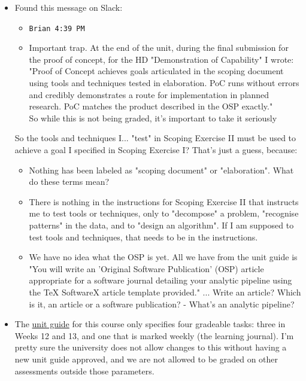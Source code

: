 \documentclass[12pt]{article}
\begin{document}
\begin{itemize}
    \item Found this message on Slack: 
    \begin{itemize}
    \renewcommand{\labelitemii}{$\nobullet$}
        \item \texttt{Brian 4:39 PM}
        \item Important trap. At the end of the unit, during the final submission for the proof of concept, for the HD "Demonstration of Capability" I wrote: "Proof of Concept achieves goals articulated in the scoping document using tools and techniques tested in elaboration. PoC runs without errors and credibly demonstrates a route for implementation in planned research. PoC matches the product described in the OSP exactly."
        \\So while this is not being graded, it's important to take it seriously
    \end{itemize}
    So the tools and techniques I... "test" in Scoping Exercise II must be used to achieve a goal I specified in Scoping Exercise I? That's just a guess, because:
    \begin{itemize}
        \item Nothing has been labeled as "scoping document" or "elaboration". What do these terms mean?
        \item There is nothing in the instructions for Scoping Exercise II that instructs me to test tools or techniques, only to "decompose" a problem, "recognise patterns" in the data, and to "design an algorithm". If I am supposed to test tools and techniques, that needs to be in the instructions.
        \item We have no idea what the OSP is yet. All we have from the unit guide is "You will write an 'Original Software Publication' (OSP) article appropriate for a software journal detailing your analytic pipeline using the TeX SoftwareX article template provided."
        ... Write an article? Which is it, an article or a software publication? 
        - What's an analytic pipeline? 
    \end{itemize}
    \item The \href{https://unitguides.mq.edu.au/unit_offerings/95891/unit_guide#assessment_task_257486}{unit guide} for this course only specifies four gradeable tasks: three in Weeks 12 and 13, and one that is marked weekly (the learning journal). I'm pretty sure the university does not allow changes to this without having a new unit guide approved, and we are not allowed to be graded on other assessments outside those parameters.

\end{itemize}
\end{document}
